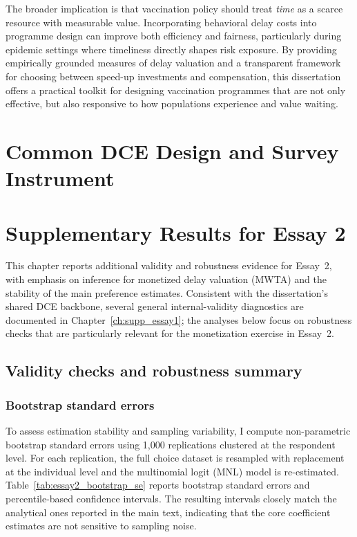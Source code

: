 \documentclass[doublespacing]{utdthesis}
\begin{document}
The broader implication is that vaccination policy should treat \emph{time} as a scarce resource with measurable value. Incorporating behavioral delay costs into programme design can improve both efficiency and fairness, particularly during epidemic settings where timeliness directly shapes risk exposure. By providing empirically grounded measures of delay valuation and a transparent framework for choosing between speed-up investments and compensation, this dissertation offers a practical toolkit for designing vaccination programmes that are not only effective, but also responsive to how populations experience and value waiting.








\clearpage



\appendix

\chapter{Common DCE Design and Survey Instrument}
\label{app:common_dce}




\chapter{Supplementary Results for Essay 2}
\label{ch:supp_essay2}



This chapter reports additional validity and robustness evidence for Essay~2, with emphasis on inference for monetized delay valuation (MWTA) and the stability of the main preference estimates. Consistent with the dissertation’s shared DCE backbone, several general internal-validity diagnostics are documented in Chapter~\ref{ch:supp_essay1}; the analyses below focus on robustness checks that are particularly relevant for the monetization exercise in Essay~2.

\section{Validity checks and robustness summary}
\label{sec:validity_robustness}

\subsection{Bootstrap standard errors}
To assess estimation stability and sampling variability, I compute non-parametric bootstrap standard errors using 1,000 replications clustered at the respondent level. For each replication, the full choice dataset is resampled with replacement at the individual level and the multinomial logit (MNL) model is re-estimated. Table~\ref{tab:essay2_bootstrap_se} reports bootstrap standard errors and percentile-based confidence intervals. The resulting intervals closely match the analytical ones reported in the main text, indicating that the core coefficient estimates are not sensitive to sampling noise.
\end{document}
